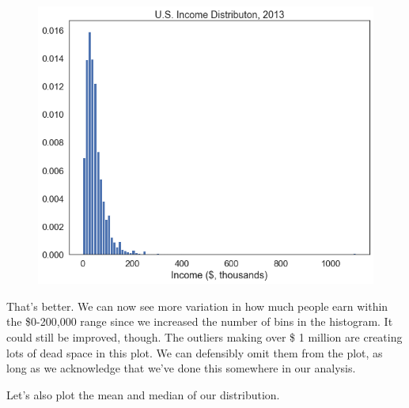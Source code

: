 \documentclass[
  letterpaper,
  DIV=11,
  numbers=noendperiod]{scrreprt}
\begin{document}
\begin{figure}[H]

{\centering \includegraphics{notebooks/W07. Distributions and Basic Statistics_files/figure-pdf/cell-12-output-1.png}

}

\end{figure}

That's better. We can now see more variation in how much people earn
within the \$0-200,000 range since we increased the number of bins in
the histogram. It could still be improved, though. The outliers making
over \$ 1 million are creating lots of dead space in this plot. We can
defensibly omit them from the plot, as long as we acknowledge that we've
done this somewhere in our analysis.

Let's also plot the mean and median of our distribution.
\end{document}
